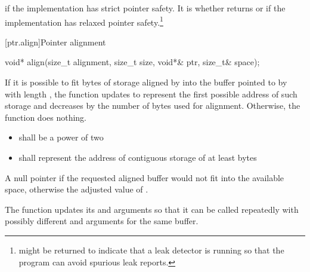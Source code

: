 \begin{itemdescr}
\pnum
\returns
{} if the implementation has strict pointer
safety. It is
whether
 returns  or
 if the implementation has relaxed pointer
safety.\footnote{ might be returned to indicate
that a leak detector is running so that the program can avoid spurious leak
reports.}
\end{itemdescr}


[ptr.align]{Pointer alignment}

%
\begin{itemdecl}
void* align(size_t alignment, size_t size, void*& ptr, size_t& space);
\end{itemdecl}

\begin{itemdescr}
\pnum
\effects
If it is possible to fit  bytes
of storage aligned by  into the buffer pointed to by
 with length , the function updates
 to represent the first possible address of such storage
and decreases  by the number of bytes used for alignment.
Otherwise, the function does nothing.

\pnum
\requires

\begin{itemize}
\item {} shall be a power of two

\item {} shall represent the address of contiguous storage of at least
 bytes
\end{itemize}

\pnum
\returns
A null pointer if the requested aligned buffer
would not fit into the available space, otherwise the adjusted value
of .

\pnum
\begin{note}
The function updates its 
and  arguments so that it can be called repeatedly
with possibly different  and 
arguments for the same buffer.
\end{note}
\end{itemdescr}

